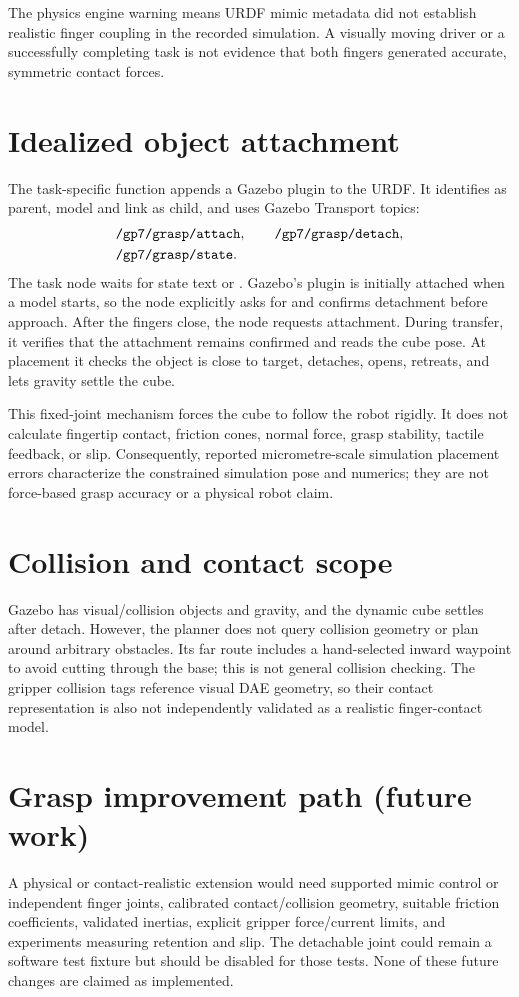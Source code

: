 The physics engine warning means URDF mimic metadata did not establish
realistic finger coupling in the recorded simulation. A visually moving
driver or a successfully completing task is not evidence that both fingers
generated accurate, symmetric contact forces.

\section{Idealized object attachment}
The task-specific function  appends a Gazebo
 plugin to the URDF. It identifies
 as parent, model  and link  as child,
and uses Gazebo Transport topics:
\begin{align*}
&\code{/gp7/grasp/attach},\qquad
\code{/gp7/grasp/detach},\\
&\code{/gp7/grasp/state}.
\end{align*}
The task node waits for state text  or . Gazebo's
plugin is initially attached when a model starts, so the node explicitly asks
for and confirms detachment before approach. After the fingers close, the node
requests attachment. During transfer, it verifies that the attachment remains
confirmed and reads the cube pose. At placement it checks the object is close
to target, detaches, opens, retreats, and lets gravity settle the cube.

This fixed-joint mechanism forces the cube to follow the robot rigidly. It
does not calculate fingertip contact, friction cones, normal force, grasp
stability, tactile feedback, or slip. Consequently, reported micrometre-scale
simulation placement errors characterize the constrained simulation pose and
numerics; they are not force-based grasp accuracy or a physical robot claim.

\section{Collision and contact scope}
Gazebo has visual/collision objects and gravity, and the dynamic cube settles
after detach. However, the planner does not query collision geometry or plan
around arbitrary obstacles. Its far route includes a hand-selected inward
waypoint to avoid cutting through the base; this is not general collision
checking. The gripper collision tags reference visual DAE geometry, so their
contact representation is also not independently validated as a realistic
finger-contact model.

\section{Grasp improvement path (future work)}
A physical or contact-realistic extension would need supported mimic control
or independent finger joints, calibrated contact/collision geometry, suitable
friction coefficients, validated inertias, explicit gripper force/current
limits, and experiments measuring retention and slip. The detachable joint
could remain a software test fixture but should be disabled for those tests.
None of these future changes are claimed as implemented.
